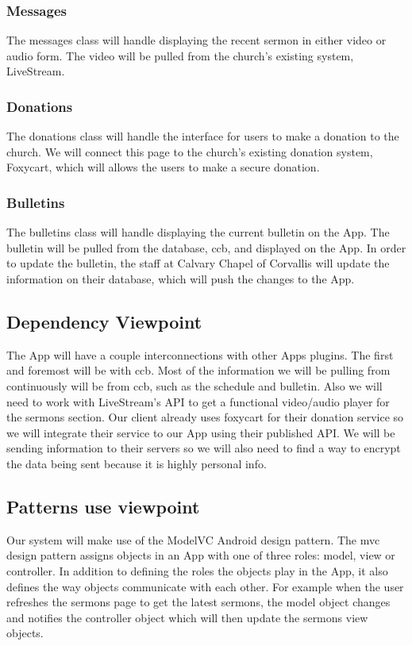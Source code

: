 \documentclass[letterpaper,10pt,draftclsnofoot,onecolumn,titlepage]{IEEEtran}
\begin{document}
			\subsubsection{Messages}
				The messages class will handle displaying the recent sermon in either video or audio form.
				The video will be pulled from the church's existing system, LiveStream.

			\subsubsection{Donations}
				The donations class will handle the interface for users to make a donation to the church.
				We will connect this page to the church's existing donation system, Foxycart, which will allows the users to make a secure donation.

			\subsubsection{Bulletins}
				The bulletins class will handle displaying the current bulletin on the \gls{App}.
				The bulletin will be pulled from the database, \gls{ccb}, and displayed on the \gls{App}.
				In order to update the bulletin, the staff at Calvary Chapel of Corvallis will update the information on their database, which will push the changes to the \gls{App}.

		\subsection{Dependency Viewpoint}
			The \gls{App} will have a couple interconnections with other \glspl{App} plugins.
			The first and foremost will be with \gls{ccb}.
			Most of the information we will be pulling from continuously will be from \gls{ccb}, such as the schedule and bulletin.
			Also we will need to work with LiveStream's API to get a functional video/audio player for the sermons section.
			Our client already uses foxycart for their donation service so we will integrate their service to our \gls{App} using their published API.
			We will be sending information to their servers so we will also need to find a way to encrypt the data being sent because it is highly personal info.

		\subsection{Patterns use viewpoint}
			Our system will make use of the \gls{ModelVC} \gls{Android} design pattern.
			The \gls{mvc} design pattern assigns objects in an \gls{App} with one of three roles: model, view or controller.
			In addition to defining the roles the objects play in the \gls{App}, it also defines the way objects communicate with each other.
			For example when the user refreshes the sermons page to get the latest sermons, the model object changes and notifies the controller object which will then update the sermons view objects.
\end{document}
